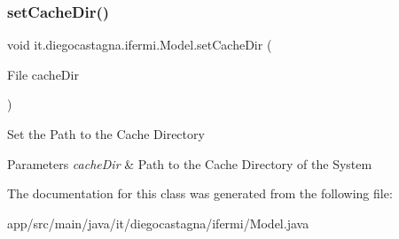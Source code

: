 \subsubsection{\texorpdfstring{setCacheDir()}{setCacheDir()}}
{\footnotesize\ttfamily void it.\+diegocastagna.\+ifermi.\+Model.\+set\+Cache\+Dir (\begin{DoxyParamCaption}\item[{File}]{cache\+Dir }\end{DoxyParamCaption})\hspace{0.3cm}{\ttfamily [inline]}}

Set the Path to the Cache Directory 
\begin{DoxyParams}{Parameters}
{\em cache\+Dir} & Path to the Cache Directory of the System \\
\hline
\end{DoxyParams}


The documentation for this class was generated from the following file\+:\begin{DoxyCompactItemize}
\item 
app/src/main/java/it/diegocastagna/ifermi/Model.\+java\end{DoxyCompactItemize}
